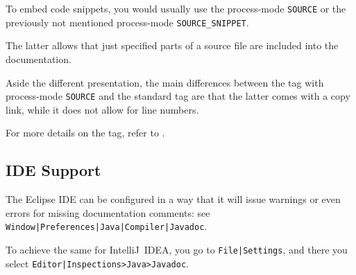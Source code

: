 To embed code snippets, you would usually use the process-mode \texttt{SOURCE} or the previously not mentioned process-mode \texttt{SOURCE\_SNIPPET}.

The latter allows that just specified parts of a source file are included into the documentation.

Aside the different presentation, the main differences between the  tag with process-mode \texttt{SOURCE} and the standard tag
 are that the latter comes with a copy link, while it does not allow for line numbers.
 
For more details on the  tag, refer to \autocite{TQUADRAT_ORG_FOUNDATION_JAVADOC}.


\subsection{IDE Support}
The Eclipse IDE can be configured in a way that it will issue warnings or even errors for missing documentation comments: see \texttt{Window|\allowbreak Preferences|\allowbreak Java|\allowbreak Compiler|\allowbreak Javadoc}.

To achieve the same for IntelliJ~IDEA, you go to \texttt{File|\allowbreak Settings}, and there you select \texttt{Editor|\allowbreak Inspections>\allowbreak Java>\allowbreak Javadoc}.

